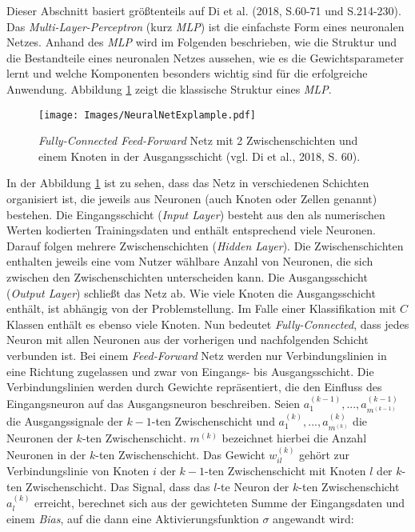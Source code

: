 \documentclass[a4paper,11pt]{article}
\begin{document}
Dieser Abschnitt basiert größtenteils auf Di et al. (2018, S.60-71 und S.214-230).\\
Das \textit{Multi-Layer-Perceptron} (kurz \textit{MLP}) ist die einfachste Form eines neuronalen Netzes. Anhand des \textit{MLP} wird im Folgenden beschrieben, wie die Struktur und die Bestandteile eines neuronalen Netzes aussehen, wie es die Gewichtsparameter lernt und welche Komponenten besonders wichtig sind für die erfolgreiche Anwendung. Abbildung \ref{abb:MLPScreen} zeigt die klassische Struktur eines \textit{MLP}.


\begin{figure}[!ht]
\begin{center}
\texttt{[image: Images/NeuralNetExplample.pdf]}
\caption{\textit{Fully-Connected Feed-Forward} Netz mit 2 Zwischenschichten und einem Knoten in der Ausgangsschicht (vgl. Di et al., 2018, S. 60).}
\label{abb:MLPScreen}
\end{center}
\end{figure}

In der Abbildung \ref{abb:MLPScreen} ist zu sehen, dass das Netz in verschiedenen Schichten organisiert ist, die jeweils aus Neuronen (auch Knoten oder Zellen genannt) bestehen. Die Eingangsschicht (\textit{Input Layer}) besteht aus den als numerischen Werten kodierten Trainingsdaten und enthält entsprechend viele Neuronen. Darauf folgen mehrere Zwischenschichten (\textit{Hidden Layer}). Die Zwischenschichten enthalten jeweils eine vom Nutzer wählbare Anzahl von Neuronen, die sich zwischen den Zwischenschichten unterscheiden kann. Die Ausgangsschicht (\textit{Output Layer}) schließt das Netz ab. Wie viele Knoten die Ausgangsschicht enthält, ist abhängig von der Problemstellung. Im Falle einer Klassifikation mit $C$ Klassen enthält es ebenso viele Knoten. Nun bedeutet \textit{Fully-Connected}, dass jedes Neuron mit allen Neuronen aus der vorherigen und nachfolgenden Schicht verbunden ist. Bei einem \textit{Feed-Forward} Netz werden nur Verbindungslinien in eine Richtung zugelassen und zwar von Eingangs- bis Ausgangsschicht. Die Verbindungslinien werden durch Gewichte repräsentiert, die den Einfluss des Eingangsneuron auf das Ausgangsneuron beschreiben. Seien $a_1^{(k-1)},..., a_{m^{(k-1)}}^{(k-1)}$ die Ausgangssignale der $k-1$-ten Zwischenschicht und $a_{1}^{(k)},..., a_{m^{(k)}}^{(k)}$ die Neuronen der $k$-ten Zwischenschicht. $m^{(k)}$ bezeichnet hierbei die Anzahl Neuronen in der $k$-ten Zwischenschicht. 
Das Gewicht $w_{il}^{(k)}$ gehört zur Verbindungslinie von Knoten $i$ der $k-1$-ten Zwischenschicht mit Knoten $l$ der $k$-ten Zwischenschicht. Das Signal, dass das $l$-te Neuron der $k$-ten Zwischenschicht $a_{l}^{(k)}$ erreicht, berechnet sich aus der gewichteten Summe der Eingangsdaten und einem \textit{Bias}, auf die dann eine Aktivierungsfunktion $\sigma$ angewandt wird:
\end{document}

